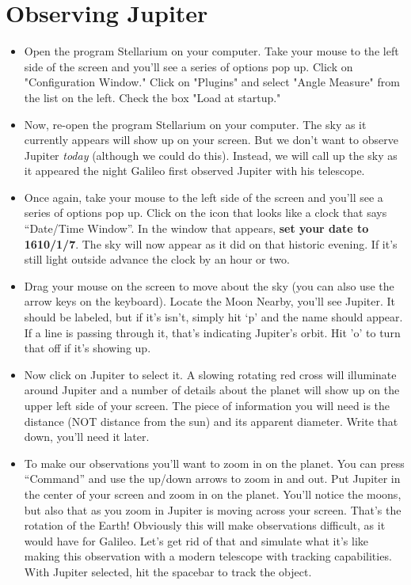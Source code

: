 \documentclass[12pt]{article}%
\begin{document}
\section*{Observing Jupiter}
\begin{itemize}
    \item Open the program Stellarium on your computer. Take your mouse to the left side of the screen and you'll see a series of options pop up. Click on "Configuration Window." Click on "Plugins" and select "Angle Measure" from the list on the left. Check the box "Load at startup."

    \item Now, re-open the program Stellarium on your computer. The sky as it currently appears will show up on your screen. But we don't want to observe Jupiter \emph{today} (although we could do this). Instead, we will call up the sky as it appeared the night Galileo first observed Jupiter with his telescope.

    \item Once again, take your mouse to the left side of the screen and you'll see a series of options pop up. Click on the icon that looks like a clock that says ``Date/Time Window''. In the window that appears, \textbf{set your date to 1610/1/7}. The sky will now appear as it did on that historic evening. If it's still light outside advance the clock by an hour or two.

    \item Drag your mouse on the screen to move about the sky (you can also use the arrow keys on the keyboard). Locate the Moon  Nearby, you'll see Jupiter. It should be labeled, but if it's isn't, simply hit `p' and the name should appear. If a line is passing through it, that's indicating Jupiter's orbit. Hit 'o' to turn that off if it's showing up.

    \item Now click on Jupiter to select it. A slowing rotating red cross will illuminate around Jupiter and a number of details about the planet will show up on the upper left side of your screen. The piece of information you will need is the distance (NOT distance from the sun) and its apparent diameter. Write that down, you'll need it later.

    \item To make our observations you'll want to zoom in on the planet. You can press ``Command'' and use the up/down arrows to zoom in and out. Put Jupiter in the center of your screen and zoom in on the planet. You'll notice the moons, but also that as you zoom in Jupiter is moving across your screen. That's the rotation of the Earth! Obviously this will make observations difficult, as it would have for Galileo. Let's get rid of that and simulate what it's like making this observation with a modern telescope with tracking capabilities. With Jupiter selected, hit the spacebar to track the object.
\end{itemize}
\end{document}
